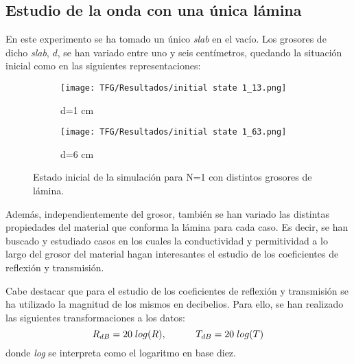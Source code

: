 \documentclass[11pt,a4paper,twoside,pdf]{article}
\numberwithin{equation}{section}
\begin{document}
\subsection{Estudio de la onda con una única lámina}
En este experimento se ha tomado un único \textit{slab} en el vacío. Los grosores de dicho \textit{slab}, $d$, se han variado entre uno y seis centímetros, quedando la situación inicial como en las siguientes representaciones:
\begin{figure}[H]
    \centering
        \begin{subfigure}[b]{0.475\textwidth}
        \centering
        \texttt{[image: TFG/Resultados/initial state 1\_13.png]}
        \caption{d=1 cm}
        \label{f:gato}
    \end{subfigure}
    \hfill
    \begin{subfigure}[b]{0.475\textwidth}
        \centering
        \texttt{[image: TFG/Resultados/initial state 1\_63.png]}
        \caption{d=6 cm}
        \label{f:tigre}
    \end{subfigure}
    \caption{Estado inicial de la simulación para N=1 con distintos grosores de lámina.}
    \label{fig5}
\end{figure}
Además, independientemente del grosor, también se han variado las distintas propiedades del material que conforma la lámina para cada caso. Es decir, se han buscado y estudiado casos en los cuales la conductividad y permitividad a lo largo del grosor del material hagan interesantes el estudio de los coeficientes de reflexión y transmisión.

Cabe destacar que para el estudio de los coeficientes de reflexión y transmisión se ha utilizado la magnitud de los mismos en decibelios. Para ello, se han realizado las siguientes transformaciones a los datos:
\begin{equation}
    R_{dB}=20\;log(R),\;\;\;\;\;\;\;\;\;\;\; T_{dB}=20\;log(T)\notag
\end{equation}
donde \textit{log} se interpreta como el logaritmo en base diez.
\end{document}
